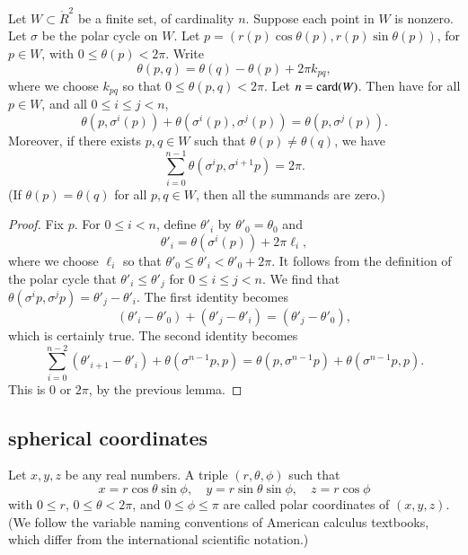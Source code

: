 \begin{lemma}\label{lemma:polar-sum} 
Let $W\subset\ring{R}^2$ be a finite set,
of cardinality $n$. Suppose each point in $W$ is nonzero.
Let $\sigma$ be the polar cycle on $W$.  
Let $p=(r(p)\cos\theta(p),r(p)\sin\theta(p))$, for $p\in W$, with
$0\le\theta(p)<2\pi$.
Write
   $$
   \theta({p,q}) = \theta(q) - \theta(p) + 2\pi k_{pq},
   $$
where we choose $k_{pq}$ so that $0\le \theta({p,q}) < 2\pi$.
Let $n={\operatorname{card}}(W)$.  Then have for all $p\in W$,
and all $0\le i \le j < n$,
   $$
   \theta(p,\sigma^i(p)) +\theta(\sigma^i(p),\sigma^j(p)) =
   \theta(p,\sigma^j(p)).
   $$
Moreover, if there exists $p,q\in W$ such that $\theta(p)\ne\theta(q)$,
we have 
  $$
  \sum_{i=0}^{n-1} \theta(\sigma^{i}p,\sigma^{i+1} p) = 2\pi.
  $$
(If $\theta(p)=\theta(q)$ for all $p,q\in W$, then all the
summands are zero.)
\end{lemma}

\begin{proof}
Fix $p$.  For $0\le i<n$, define $\theta'_i$ by
   $\theta'_0=\theta_0$ and 
   $$\theta'_i = \theta(\sigma^i(p)) + 2\pi \ell_i,$$
where we choose $\ell_i$ so that $\theta'_0\le \theta'_i < \theta'_0+2\pi$.
It follows from the definition of the polar cycle that
$\theta'_i \le \theta'_j$ for $0\le i\le j < n$. We find that
$\theta(\sigma^i p ,\sigma^j p) = \theta'_j - \theta'_i$.
The first identity becomes
  $$
  (\theta'_i-\theta'_0) + (\theta'_j-\theta'_i) = (\theta'_j-\theta'_0),
  $$
which is certainly true.
The second identity becomes
  $$
  \sum_{i=0}^{n-2} (\theta'_{i+1}-\theta'_i) + \theta(\sigma^{n-1}p,p)
  = \theta(p,\sigma^{n-1}p) + \theta(\sigma^{n-1}p,p).
  $$
This is $0$ or $2\pi$, by the previous lemma.
\end{proof}

\subsection{spherical coordinates}
\label{sec:spherical}


\begin{definition}
Let $x,y,z$ be any real numbers.  A
triple $(r,\theta,\phi)$ such that
    \begin{equation}
    \label{eqn:spherical}
    x = r\cos\theta\sin\phi,\quad y = r\sin\theta\sin\phi,\quad
    z = r\cos\phi
    \end{equation}
with $0\le r$, $0\le\theta<2\pi$, and $0\le\phi\le\pi$ are called
polar coordinates of $(x,y,z)$.  (We follow the variable
naming conventions of American calculus textbooks, which differ
from the international scientific notation.)
\end{definition}


